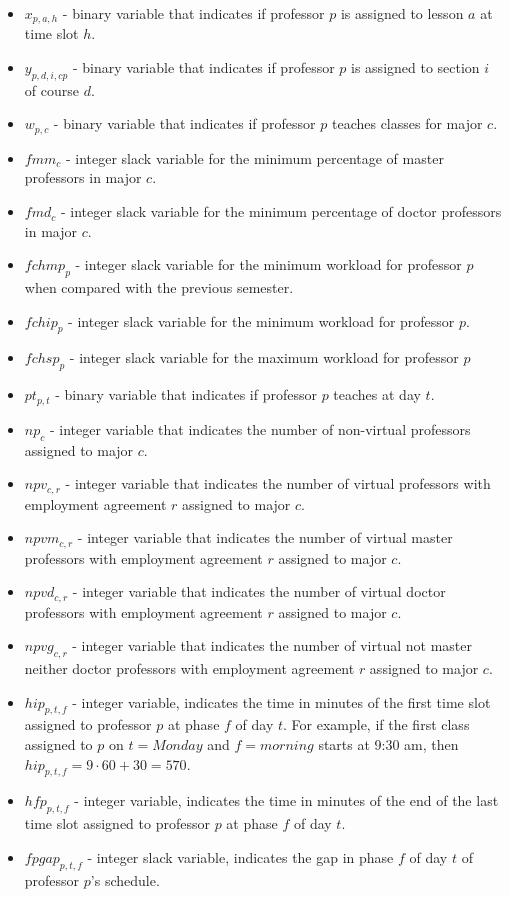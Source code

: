 \begin{itemize}
\item $x_{p,a,h}$ - binary variable that indicates if professor $p$ is assigned to lesson $a$ at time slot $h$.
\item $y_{p,d,i,cp}$ - binary variable that indicates if professor $p$ is assigned to section $i$ of course $d$.
\item $w_{p,c}$ - binary variable that indicates if professor $p$ teaches classes for major $c$.
\item $fmm_{c}$ - integer slack variable for the minimum percentage of master professors in major $c$.
\item $fmd_{c}$ - integer slack variable for the minimum percentage of doctor professors in major $c$.
\item $fchmp_{p}$ - integer slack variable for the minimum workload for professor $p$ when compared with the previous semester.
\item $fchip_{p}$ - integer slack variable for the minimum workload for professor $p$.
\item $fchsp_{p}$ - integer slack variable for the maximum workload for professor $p$
\item $pt_{p,t}$ - binary variable that indicates if professor $p$ teaches at day $t$.
\item $np_{c}$ - integer variable that indicates the number of non-virtual professors assigned to major $c$.
\item $npv_{c,r}$ - integer variable that indicates the number of virtual professors with employment agreement $r$ assigned to major $c$.
\item $npvm_{c,r}$ - integer variable that indicates the number of virtual master professors with employment agreement $r$ assigned to major $c$.
\item $npvd_{c,r}$ - integer variable that indicates the number of virtual doctor professors with employment agreement $r$ assigned to major $c$.
\item $npvg_{c,r}$ - integer variable that indicates the number of virtual not master neither doctor professors with employment agreement $r$ assigned to major $c$.
\item $hip_{p,t,f}$ - integer variable, indicates the time in minutes of the first time slot assigned to professor $p$ at phase $f$ of day $t$. For example, if the first class assigned to $p$ on $t=Monday$ and $f=morning$ starts at 9:30 am, then $hip_{p,t,f}=9\cdot 60 + 30 = 570$.
\item $hfp_{p,t,f}$ - integer variable, indicates the time in minutes of the end of the last time slot assigned to professor $p$ at phase $f$ of day $t$.
\item $fpgap_{p,t,f}$ - integer slack variable, indicates the gap in phase $f$ of day $t$ of professor $p$'s schedule.
\end{itemize}


